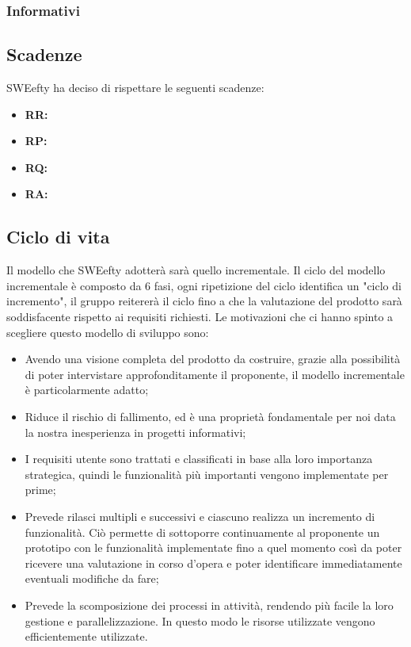 			\subsubsection{Informativi}
	\subsection{Scadenze}
	SWEefty ha deciso di rispettare le seguenti scadenze:
	\begin{itemize}
		\item \textbf{RR:}
		\item \textbf{RP:}
		\item \textbf{RQ:}
		\item \textbf{RA:}
	\end{itemize}
	\subsection{Ciclo di vita}	
	Il modello che SWEefty adotterà sarà quello incrementale. Il ciclo del modello incrementale è composto da 6 fasi, ogni ripetizione del ciclo identifica un "ciclo di incremento", il gruppo reitererà il ciclo fino a che la valutazione del prodotto sarà soddisfacente rispetto ai requisiti richiesti.
	Le motivazioni che ci hanno spinto a scegliere questo modello di sviluppo sono:
	\begin{itemize}
		\item Avendo una visione completa del prodotto da costruire, grazie alla possibilità di poter intervistare approfonditamente il proponente, il modello incrementale è particolarmente adatto;
		\item Riduce il rischio di fallimento, ed è una proprietà fondamentale per noi data la nostra inesperienza in progetti informativi;
		\item I requisiti utente sono trattati e classificati in base alla loro importanza strategica, quindi le funzionalità più importanti vengono implementate per prime;
		\item Prevede rilasci multipli e successivi e ciascuno realizza un incremento di funzionalità. Ciò permette di sottoporre continuamente al proponente un prototipo con le funzionalità implementate fino a quel momento così da poter ricevere una valutazione in corso d'opera e poter identificare immediatamente eventuali modifiche da fare;
		\item Prevede la scomposizione dei processi in attività, rendendo più facile la loro gestione e parallelizzazione. In questo modo le risorse utilizzate vengono efficientemente utilizzate.
	\end{itemize}
